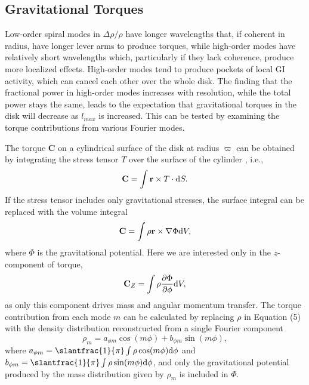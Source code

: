 \documentclass[manuscript]{aastex} %
\begin{document}
\subsection{Gravitational Torques}

Low-order spiral modes in $\Delta\rho / \rho$  have longer wavelengths that, if coherent in radius, have longer lever 
arms to produce torques, while high-order modes have relatively short wavelengths which, particularly if they 
lack coherence, produce more localized effects. High-order modes tend to produce pockets of local GI activity, 
which can cancel each other over the whole disk.  The finding that the fractional power in high-order modes increases
with resolution, while the total power stays the same, leads to
 the expectation that  gravitational torques in the disk will decrease as $l_{max}$ is increased. This can be tested by examining the torque contributions from  various Fourier modes.

The torque {\bf C} on a cylindrical surface of the disk at radius $\varpi$ can be obtained by integrating the stress tensor $T$ over the surface of the cylinder \citep{lyndenbell1972}, i.e.,
\begin{equation}
{\rm {\bf C}} = \int {\bf r} \times T \cdot {\rm d}S.
\end{equation}
If the stress tensor includes only gravitational stresses, the surface integral can be replaced with the volume integral
\begin{equation}
{\rm \bf C} = \int \rho {\bf r} \times \nabla \Phi {\rm d}V,
\end{equation}
where $\Phi$ is the gravitational potential.  Here we are interested only in the $z$-component of torque,  
\begin{equation}
\label{torque1}
{\rm \bf C}_Z = \int \rho \frac{\partial\Phi} {\partial \phi} {\rm d}V,
\end{equation}
as only this component drives mass and angular momentum transfer. The torque contribution from each mode $m$ can be calculated by replacing $\rho$ in Equation (5) with the density distribution reconstructed from a single Fourier component
\begin{equation}
\rho_m = a_{\phi m} \cos(m\phi) + b_{\phi m} \sin(m\phi),
\end{equation}
where $a_{\phi m} =\slantfrac{1}{\pi} \int \rho \cos(m\phi){\rm d}\phi$ and $b_{\phi m} =\slantfrac{1}{\pi} \int \rho \sin(m\phi){\rm d}\phi$, and only the gravitational potential produced by the mass distribution given by $\rho_m$ is included in $\Phi$.
\end{document}
